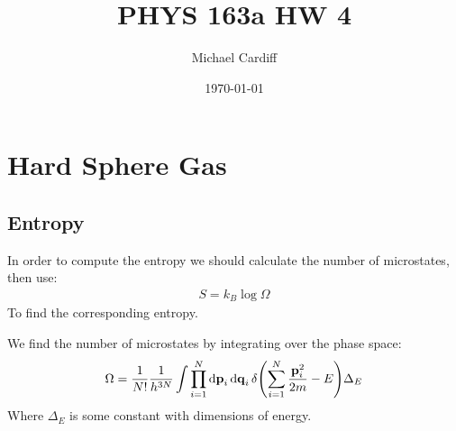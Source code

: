\documentclass[12pt]{article}
\title{\vspace{-3em}PHYS 163a HW 4}
\author{Michael Cardiff}
\date{\today}
\begin{document}
\maketitle

\section{Hard Sphere Gas}
\subsection{Entropy}
In order to compute the entropy we should calculate the number of microstates, then use:
\begin{align*}
  S=k_B\log\Omega
\end{align*}
To find the corresponding entropy.

We find the number of microstates by integrating over the phase space:
\begin{align*}
  \Omega=\frac1{N!}\frac1{h^{3N}}\int\prod_{i=1}^N\dd{\vb{p}}_i\dd{\vb{q}}_i
  \delta\qty(\sum_{i=1}^N\frac{\vb{p}_i^2}{2m}-E)\Delta_E
\end{align*}
Where $\Delta_E$ is some constant with dimensions of energy.
\end{document}
